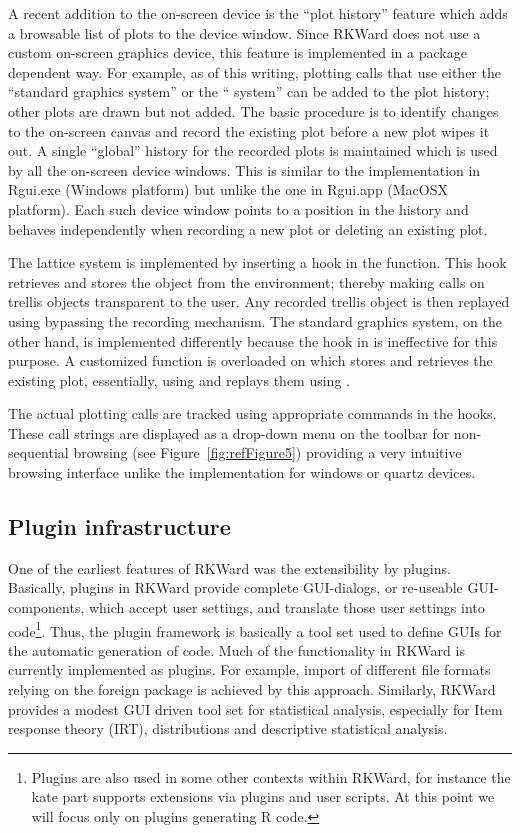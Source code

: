 A recent addition to the on-screen device is the ``plot history'' feature which
adds a browsable list of plots to the device window. Since RKWard does not use a
custom on-screen graphics device, this feature is implemented in a package
dependent way. For example, as of this writing, plotting calls that use either
the ``standard graphics system'' or the `` system'' can be added to the plot
history; other plots are drawn but not added. The basic procedure is to identify
changes to the on-screen canvas and record the existing plot before a new plot
wipes it out. A single ``global'' history for the recorded plots is maintained
which is used by all the on-screen device windows. This is similar to the
implementation in Rgui.exe (Windows platform) but unlike the one in Rgui.app
(MacOSX platform). Each such device window points to a position in the history
and behaves independently when recording a new plot or deleting an existing
plot.

The lattice system is implemented by inserting a hook in the 
function. This hook retrieves and stores the  object from the
 environment; thereby making  calls on trellis
objects transparent to the user. Any recorded trellis object is then replayed
using  bypassing the recording mechanism. The standard graphics
system, on the other hand, is implemented differently because the hook in
 is ineffective for this purpose. A customized function is overloaded
on  which stores and retrieves the existing plot, essentially, using
 and replays them using .

The actual plotting calls are tracked using appropriate  commands in
the hooks. These call strings are displayed as a drop-down menu on the toolbar
for non-sequential browsing (see Figure~\ref{fig:refFigure5}) providing a very intuitive browsing
interface unlike the implementation for windows or quartz devices.

\subsection{Plugin infrastructure}
\label{sec:technical_plugins}
One of the earliest features of RKWard was the extensibility by plugins.
Basically, plugins in RKWard provide complete GUI-dialogs, or re-useable
GUI-components, which accept user settings, and translate those user settings
into  code\footnote{
    Plugins are also used in some other contexts within RKWard, for instance the
    kate part supports extensions via plugins and user scripts. At this point we
    will focus only on plugins generating R code.
}. Thus, the plugin framework is basically a tool set used to define
GUIs for the automatic generation of  code. Much of the functionality in RKWard
is currently implemented as plugins. For example, import of different file
formats relying on the foreign package is achieved by this approach. Similarly,
RKWard provides a modest GUI driven tool set for statistical analysis,
especially for Item response theory (IRT), distributions and descriptive
statistical analysis. 

